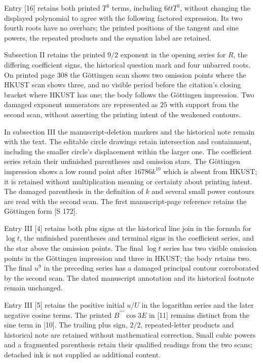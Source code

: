 Entry [16] retains both printed $T^3$ terms, including $6ttT^3$, without changing the displayed polynomial to agree with the following factored expression. Its two fourth roots have no overbars; the printed positions of the tangent and sine powers, the repeated products and the equation label are retained.

Subsection II retains the printed $9/2$ exponent in the opening series for $R$, the differing coefficient signs, the historical question mark and four unbarred roots. On printed page 308 the Göttingen scan shows two omission points where the HKUST scan shows three, and no visible period before the citation’s closing bracket where HKUST has one; the body follows the Göttingen impression. Two damaged exponent numerators are represented as $25$ with support from the second scan, without asserting the printing intent of the weakened contours.

In subsection III the manuscript-deletion markers and the historical note remain with the text. The editable circle drawings retain intersection and containment, including the smaller circle’s displacement within the larger one. The coefficient series retain their unfinished parentheses and omission stars. The Göttingen impression shows a low round point after $16786k^{10}$ which is absent from HKUST; it is retained without multiplication meaning or certainty about printing intent. The damaged parenthesis in the definition of $k$ and several small power contours are read with the second scan. The first manuscript-page reference retains the Göttingen form [S 172].

Entry III [4] retains both plus signs at the historical line join in the formula for $\log t$, the unfinished parentheses and terminal signs in the coefficient series, and the star above the omission points. The final $\log t$ series has two visible omission points in the Göttingen impression and three in HKUST; the body retains two. The final $u^9$ in the preceding series has a damaged principal contour corroborated by the second scan. The dated manuscript annotation and its historical footnote remain unchanged.

Entry III [5] retains the positive initial $u/U$ in the logarithm series and the later negative cosine terms. The printed $B^{\prime\prime\prime}\cos3E$ in [11] remains distinct from the sine term in [10]. The trailing plus sign, $2/2$, repeated-letter products and historical note are retained without mathematical correction. Small cubic powers and a fragmented parenthesis retain their qualified readings from the two scans; detached ink is not supplied as additional content.

